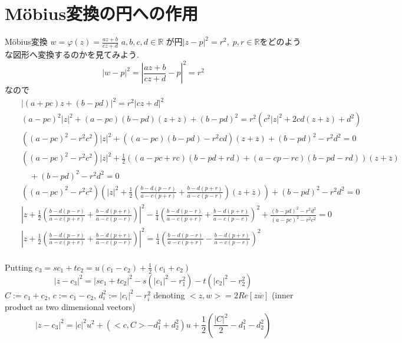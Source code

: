 \documentclass[a4j,12pt]{jarticle}
\numberwithin{equation}{section}
\newcommand{\R}{\mathbb R}
\begin{document}
\section{M\"obius変換の円への作用}
M\"obius変換 $w = \varphi(z) = \frac{az+b}{cz+d}$ $a,b,c,d \in \R$ が円$|z-p|^2=r^2, \; p,r\in\R$をどのような図形へ変換するのかを見てみよう.
\begin{equation}
\label{}
|w-p|^2 = \left| \frac{az+b}{cz+d} - p \right|^2 = r^2
\end{equation}
なので
\begin{eqnarray}
  &&|(a+pc)z+(b-pd)|^2 = r^2|cz+d|^2  \nonumber\\
  &&(a-pc)^2|z|^2+(a-pc)(b-pd)(z+\overline{z}) + (b-pd)^2 = r^2(c^2|z|^2+2cd(z+\overline{z}) +d^2) \nonumber\\
  &&((a-pc)^2 - r^2c^2)|z|^2+((a-pc)(b-pd) - r^2cd)(z+\overline{z}) + (b-pd)^2 - r^2d^2= 0 \nonumber\\
  &&((a-pc)^2 - r^2c^2)|z|^2+\frac{1}{2}((a-pc + rc)(b-pd+rd) + (a-cp-rc)(b-pd-rd))(z+\overline{z}) \nonumber\\
  && \quad + (b-pd)^2 - r^2d^2= 0 \nonumber\\
  &&((a-pc)^2 - r^2c^2)\left(|z|^2+\frac{1}{2}\left(\frac{b-d(p-r)}{a-c(p+r)} + \frac{b-d(p+r)}{a-c(p-r)}\right)(z+\overline{z})\right) + (b-pd)^2 - r^2d^2= 0 \nonumber\\
  &&\left|z+\frac{1}{2}\left(\frac{b-d(p-r)}{a-c(p+r)} + \frac{b-d(p+r)}{a-c(p-r)}\right)\right|^2 -\frac{1}{4}\left(\frac{b-d(p-r)}{a-c(p+r)} + \frac{b-d(p+r)}{a-c(p-r)}\right)^2 + \frac{(b-pd)^2 - r^2d^2}{(a-pc)^2 - r^2c^2}= 0 \nonumber\\
  &&\left|z+\frac{1}{2}\left(\frac{b-d(p-r)}{a-c(p+r)} + \frac{b-d(p+r)}{a-c(p-r)}\right)\right|^2 = \frac{1}{4}\left(\frac{b-d(p-r)}{a-c(p+r)} - \frac{b-d(p+r)}{a-c(p-r)}\right)^2 \nonumber\\
\end{eqnarray}

Putting $c_3 = sc_1+tc_2 = u(c_1-c_2) + \frac{1}{2}(c_1+c_2)$
\begin{equation}
\label{ }
|z-c_3|^2 = |sc_1+tc_2|^2 - s(|c_1|^2 -r_1^2) - t(|c_2|^2-r_2^2) 
\end{equation}
$C:=c_1+c_2$, $c:= c_1-c_2$, $d_i^2 := |c_i|^2 -r_i^2$ denoting $<z,w>=2Re[z\overline{w}]$ (inner product as two dimensional vectors)
\begin{equation}
\label{ }
|z-c_3|^2 = |c|^2 u^2 + (<c,C> - d_1^2 + d_2^2) u + \frac{1}{2}(\frac{|C|^2}{2}-d_1^2- d_2^2)
\end{equation}
\end{document}
